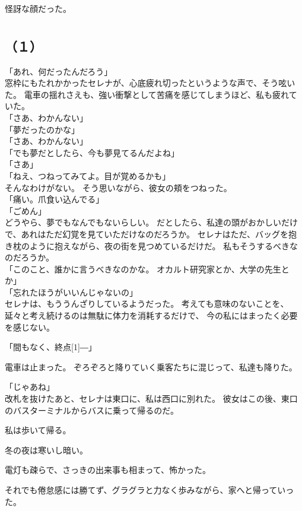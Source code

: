 \documentclass[../IHMain]{subfiles}
\begin{document}
怪訝な顔だった。

\section{}
\subsection*{（１）}
「あれ、何だったんだろう」\\
窓枠にもたれかかったセレナが、心底疲れ切ったというような声で、そう呟いた。
電車の揺れさえも、強い衝撃として苦痛を感じてしまうほど、私も疲れていた。\\
「さあ、わかんない」\\
「夢だったのかな」\\
「さあ、わかんない」\\
「でも夢だとしたら、今も夢見てるんだよね」\\
「さあ」\\
「ねえ、つねってみてよ。目が覚めるかも」\\
そんなわけがない。
そう思いながら、彼女の頬をつねった。\\
「痛い。爪食い込んでる」\\
「ごめん」\\
どうやら、夢でもなんでもないらしい。
だとしたら、私達の頭がおかしいだけで、あれはただ幻覚を見ていただけなのだろうか。
セレナはただ、バッグを抱き枕のように抱えながら、夜の街を見つめているだけだ。
私もそうするべきなのだろうか。\\
「このこと、誰かに言うべきなのかな。
オカルト研究家とか、大学の先生とか」\\
「忘れたほうがいいんじゃないの」\\
セレナは、もううんざりしているようだった。
考えても意味のないことを、延々と考え続けるのは無駄に体力を消耗するだけで、
今の私にはまったく必要を感じない。

「間もなく、終点\scalebox{3}[1]{―}」

電車は止まった。
ぞろぞろと降りていく乗客たちに混じって、私達も降りた。

「じゃあね」\\
改札を抜けたあと、セレナは東口に、私は西口に別れた。
彼女はこの後、東口のバスターミナルからバスに乗って帰るのだ。

私は歩いて帰る。

冬の夜は寒いし暗い。

電灯も疎らで、さっきの出来事も相まって、怖かった。

それでも倦怠感には勝てず、グラグラと力なく歩みながら、家へと帰っていった。
\end{document}
